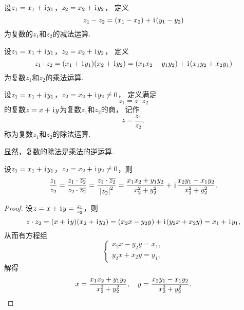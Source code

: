 \begin{definition}%
设\(z_1=x_1+\kern1pt\mathrm{i}\kern1pt y_1\)，\(z_2=x_2+\kern1pt\mathrm{i}\kern1pt y_2\)，
定义\begin{equation*}
	z_1-z_2=(x_1-x_2)+\kern1pt\mathrm{i}\kern1pt(y_1-y_2)
\end{equation*}为复数的\(z_1\)和\(z_2\)的减法运算.
\end{definition}

\begin{definition}%
设\(z_1 = x_1 + \kern1pt\mathrm{i}\kern1pt y_1\)，\(z_2 = x_2 + \kern1pt\mathrm{i}\kern1pt y_2\)，
定义\begin{equation*}
	z_1 \cdot z_2
	= (x_1 + \kern1pt\mathrm{i}\kern1pt y_1)(x_2 + \kern1pt\mathrm{i}\kern1pt y_2)
	= (x_1 x_2 - y_1 y_2)+\kern1pt\mathrm{i}\kern1pt(x_1 y_2 + x_2 y_1)
\end{equation*}为复数\(z_1\)和\(z_2\)的乘法运算.
\end{definition}

\begin{definition}%
设\(z_1 = x_1 + \kern1pt\mathrm{i}\kern1pt y_1\)，\(z_2 = x_2 + \kern1pt\mathrm{i}\kern1pt y_2 \neq 0\)，
定义满足\begin{equation*}
z_1 = z \cdot z_2
\end{equation*}的复数\(z = x + \kern1pt\mathrm{i}\kern1pt y\)为复数\(z_1\)和\(z_2\)的商，
记作\begin{equation*}
z = \frac{z_1}{z_2},
\end{equation*}称为复数\(z_1\)和\(z_2\)的除法运算.

显然，复数的除法是乘法的逆运算.
\end{definition}

\begin{theorem}
设\(z_1 = x_1 + \kern1pt\mathrm{i}\kern1pt y_1\)，\(z_2 = x_2 + \kern1pt\mathrm{i}\kern1pt y_2 \neq 0\)，则\begin{equation*}
	\frac{z_1}{z_2}
	= \frac{z_1 \cdot \overline{z_2}}{z_2 \cdot \overline{z_2}}
	= \frac{z_1 \cdot \overline{z_2}}{\abs{z_2}^2}
	= \frac{x_1 x_2 + y_1 y_2}{x_2^2 + y_2^2}
	+ \kern1pt\mathrm{i}\kern1pt \frac{x_2 y_1 - x_1 y_2}{x_2^2 + y_2^2}.
\end{equation*}
\begin{proof}
设\(z = x + \kern1pt\mathrm{i}\kern1pt y = \frac{z_1}{z_2}\)，则\begin{equation*}
	z \cdot z_2 = (x + \kern1pt\mathrm{i}\kern1pt y)(x_2 + \kern1pt\mathrm{i}\kern1pt y_2)
	= (x_2 x - y_2 y) + \kern1pt\mathrm{i}\kern1pt(y_2 x + x_2 y)
	= x_1 + \kern1pt\mathrm{i}\kern1pt y_1,
\end{equation*}
从而有方程组\begin{equation*}
	\left\{ \begin{array}{l}
		x_2 x - y_2 y = x_1, \\
		y_2 x + x_2 y = y_1,
	\end{array} \right.
\end{equation*}
解得\begin{equation*}
	x = \frac{x_1 x_2 + y_1 y_2}{x_2^2 + y_2^2},
	\quad
	y = \frac{x_2 y_1 - x_1 y_2}{x_2^2 + y_2^2}.
	\qedhere
\end{equation*}
\end{proof}
\end{theorem}

